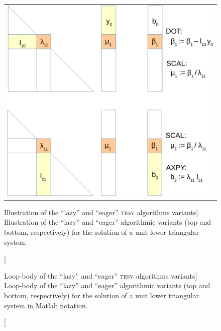 \begin{figure}[t]
\begin{center}
\begin{tabular}{c}
\includegraphics[width=.5\columnwidth]{plots/lazy_eagar}
\end{tabular}
\end{center}
\caption
[Illustration of the ``lazy'' and ``eager'' \textsc{trsv} algorithms variants]
{Illustration of the ``lazy'' and ``eager'' algorithmic variants (top and bottom, respectively)
    for the solution of a unit lower triangular system.}
\label{2017-lu-block-jacobi:fig:trsfig}
\end{figure}


\begin{figure}[t]


\caption
[Loop-body of the ``lazy'' and ``eager'' \textsc{trsv} algorithms variants]
{Loop-body of the ``lazy'' and ``eager'' algorithmic variants (top and bottom, respectively)
for the solution of a unit lower triangular system in Matlab notation.}
\label{2017-lu-block-jacobi:fig:trs}
\end{figure}

